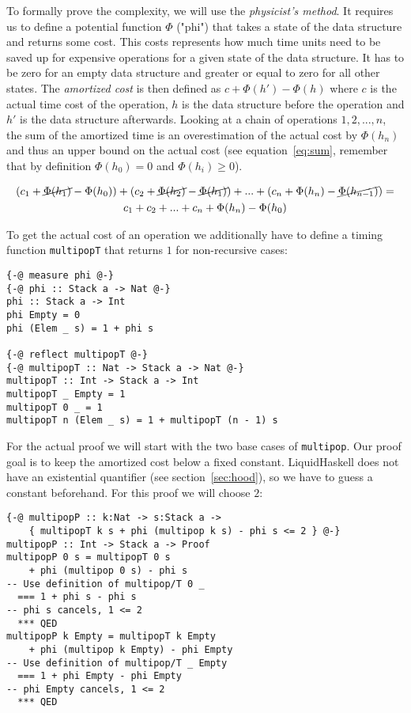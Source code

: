 \documentclass[acmlarge,screen,authorversion=true,nonacm=true]{acmart}
\begin{document}
To formally prove the complexity, we will use the \textit{physicist's method}. It requires us to define a potential function $\Phi$ ("phi") that takes a state of the data structure and returns some cost. This costs represents how much time units need to be saved up for expensive operations for a given state of the data structure. It has to be zero for an empty data structure and greater or equal to zero for all other states. The \textit{amortized cost} is then defined as $c + \Phi(h') - \Phi(h)$ where $c$ is the actual time cost of the operation, $h$ is the data structure before the operation and $h'$ is the data structure afterwards. Looking at a chain of operations $1, 2, ..., n$, the sum of the amortized time is an overestimation of the actual cost by $\Phi(h_n)$ and thus an upper bound on the actual cost (see equation~\ref{eq:sum}, remember that by definition $\Phi(h_0) = 0$ and $\Phi(h_i) \ge 0$).

\begin{gather}
\nonumber (c_1 + \cancel{\Phi(h_1)} - \Phi(h_0)) + (c_2 + \cancel{\Phi(h_2)} - \cancel{\Phi(h_1)}) + ... + (c_n + \Phi(h_n) - \cancel{\Phi(h_{n - 1})}) = \\
  c_1 + c_2 + ... + c_n + \Phi(h_n) - \Phi(h_0) \label{eq:sum}
\end{gather}

To get the actual cost of an operation we additionally have to define a timing function \texttt{multipopT} that returns $1$ for non-recursive cases:

\begin{lstlisting}
{-@ measure phi @-}
{-@ phi :: Stack a -> Nat @-}
phi :: Stack a -> Int
phi Empty = 0
phi (Elem _ s) = 1 + phi s

{-@ reflect multipopT @-}
{-@ multipopT :: Nat -> Stack a -> Nat @-}
multipopT :: Int -> Stack a -> Int
multipopT _ Empty = 1
multipopT 0 _ = 1
multipopT n (Elem _ s) = 1 + multipopT (n - 1) s
\end{lstlisting}

For the actual proof we will start with the two base cases of \texttt{multipop}. Our proof goal is to keep the amortized cost below a fixed constant. LiquidHaskell does not have an existential quantifier (see section~\ref{sec:hood}), so we have to guess a constant beforehand. For this proof we will choose $2$:

\begin{lstlisting}
{-@ multipopP :: k:Nat -> s:Stack a ->
    { multipopT k s + phi (multipop k s) - phi s <= 2 } @-}
multipopP :: Int -> Stack a -> Proof
multipopP 0 s = multipopT 0 s
    + phi (multipop 0 s) - phi s
-- Use definition of multipop/T 0 _
  === 1 + phi s - phi s
-- phi s cancels, 1 <= 2
  *** QED
multipopP k Empty = multipopT k Empty
    + phi (multipop k Empty) - phi Empty
-- Use definition of multipop/T _ Empty
  === 1 + phi Empty - phi Empty
-- phi Empty cancels, 1 <= 2
  *** QED
\end{lstlisting}
\end{document}
